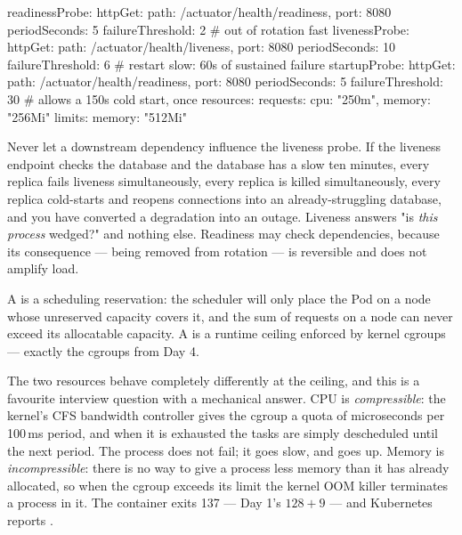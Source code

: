 \begin{k8sbox}
readinessProbe:
  httpGet: { path: /actuator/health/readiness, port: 8080 }
  periodSeconds: 5
  failureThreshold: 2      # out of rotation fast
livenessProbe:
  httpGet: { path: /actuator/health/liveness, port: 8080 }
  periodSeconds: 10
  failureThreshold: 6      # restart slow: 60s of sustained failure
startupProbe:
  httpGet: { path: /actuator/health/readiness, port: 8080 }
  periodSeconds: 5
  failureThreshold: 30     # allows a 150s cold start, once
resources:
  requests: { cpu: "250m", memory: "256Mi" }
  limits:   { memory: "512Mi" }
\end{k8sbox}

\begin{reliability}
Never let a downstream dependency influence the liveness probe. If the liveness endpoint checks the database and the database has a slow ten minutes, every replica fails liveness simultaneously, every replica is killed simultaneously, every replica cold-starts and reopens connections into an already-struggling database, and you have converted a degradation into an outage. Liveness answers "is \emph{this process} wedged?" and nothing else. Readiness may check dependencies, because its consequence --- being removed from rotation --- is reversible and does not amplify load.
\end{reliability}

 A  is a scheduling reservation: the scheduler will only place the Pod on a node whose unreserved capacity covers it, and the sum of requests on a node can never exceed its allocatable capacity. A  is a runtime ceiling enforced by kernel cgroups --- exactly the cgroups from Day 4.

The two resources behave completely differently at the ceiling, and this is a favourite interview question with a mechanical answer. CPU is \emph{compressible}: the kernel's CFS bandwidth controller gives the cgroup a quota of microseconds per 100\,ms period, and when it is exhausted the tasks are simply descheduled until the next period. The process does not fail; it goes slow, and  goes up. Memory is \emph{incompressible}: there is no way to give a process less memory than it has already allocated, so when the cgroup exceeds its limit the kernel OOM killer terminates a process in it. The container exits 137 --- Day 1's $128 + 9$ --- and Kubernetes reports .

